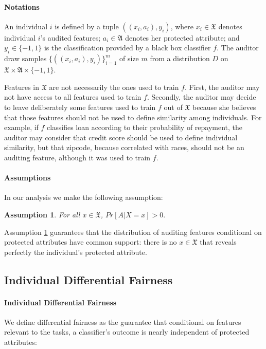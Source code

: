 \documentclass{article}
\newtheorem{assumption}{Assumption}
\begin{document}
\paragraph{Notations}
An individual $i$ is defined by a tuple $((x_{i}, a_{i}), y_{i})$, where $x_{i}\in \mathfrak{X}$ denotes individual $i$'s audited features; $a_{i}\in\mathfrak{A}$ denotes her protected attribute; and $y_{i}\in \{-1, 1\}$ is the classification provided by a black box classifier $f$. The auditor draw samples $
\{((x_{i}, a_{i}), y_{i})\}_{i=1}^{m}$ of size $m$ from a distribution $D$ on $\mathfrak{X} \times \mathfrak{A}\times \{-1, 1\}$. 

\bigskip
Features in $\mathfrak{X}$ are not necessarily the ones used to train $f$. First, the auditor may not have access to all features used to train $f$. Secondly, the auditor may decide to leave deliberately some features used to train $f$ out of $\mathfrak{X}$ because she believes that those features should not be used to define similarity among individuals. For example, if $f$ classifies loan according to their probability of repayment, the auditor may consider that credit score should be used to define individual similarity, but that zipcode, because correlated with races, should not be an auditing feature, although it was used to train $f$.  

\paragraph{Assumptions}
In our analysis we make the following assumption:
\begin{assumption}
\label{ass: 1}
For all $x\in \mathfrak{X}$, $Pr[A|X=x] > 0.$
\end{assumption}
Assumption \ref{ass: 1} guarantees that the distribution of auditing features conditional on protected attributes have common support: there is no $x\in \mathfrak{X}$ that reveals perfectly the individual's protected attribute.  

\subsection{Individual Differential Fairness}
\paragraph{Individual Differential Fairness} 
We define differential fairness as the guarantee that conditional on features relevant to the tasks, a classifier's outcome is nearly independent of protected attributes: 
\end{document}
